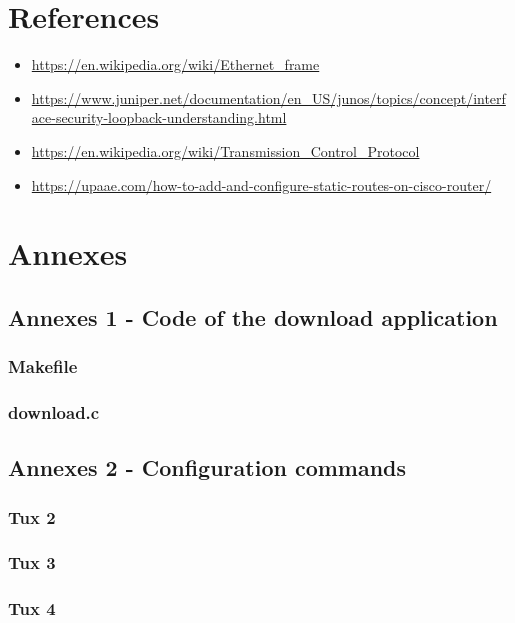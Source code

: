 \documentclass[11pt]{report}
\begin{document}
{\let\clearpage\relax\chapter{References}}
\begin{itemize}
  \item \url{https://en.wikipedia.org/wiki/Ethernet_frame}
  \item \url{https://www.juniper.net/documentation/en_US/junos/topics/concept/interface-security-loopback-understanding.html}
  \item \url{https://en.wikipedia.org/wiki/Transmission_Control_Protocol}
  \item \url{https://upaae.com/how-to-add-and-configure-static-routes-on-cisco-router/}
\end{itemize}

\chapter{Annexes}

\section{Annexes 1 - Code of the download application}
\subsection{Makefile}


\subsection{download.c}


\section{Annexes 2 - Configuration commands}
\subsection{Tux 2}


\subsection{Tux 3}


\subsection{Tux 4}

\end{document}
